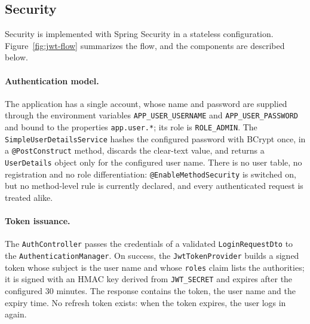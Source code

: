\subsection{Security}
\label{sec:impl-security}

Security is implemented with Spring Security in a stateless configuration. Figure~\ref{fig:jwt-flow} summarizes the flow, and the components are described below.



\paragraph{Authentication model.} The application has a single account, whose name and password are supplied through the environment variables \texttt{APP\_USER\_USERNAME} and \texttt{APP\_USER\_PASSWORD} and bound to the properties \texttt{app.user.*}; its role is \texttt{ROLE\_ADMIN}. The \texttt{SimpleUserDetailsService} hashes the configured password with BCrypt once, in a \texttt{@PostConstruct} method, discards the clear-text value, and returns a \texttt{UserDetails} object only for the configured user name. There is no user table, no registration and no role differentiation: \texttt{@EnableMethodSecurity} is switched on, but no method-level rule is currently declared, and every authenticated request is treated alike.


\paragraph{Token issuance.} The \texttt{AuthController} passes the credentials of a validated \texttt{LoginRequestDto} to the \texttt{AuthenticationManager}. On success, the \texttt{JwtTokenProvider} builds a signed token whose subject is the user name and whose \texttt{roles} claim lists the authorities; it is signed with an HMAC key derived from \texttt{JWT\_SECRET} and expires after the configured 30 minutes. The response contains the token, the user name and the expiry time. No refresh token exists: when the token expires, the user logs in again.


